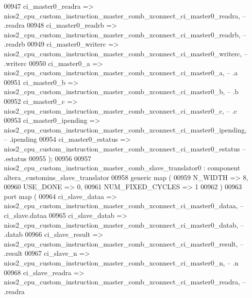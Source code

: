 \begin{DoxyCode}
00947             ci\_master0\_readra   => 
      nios2_cpu_custom_instruction_master_comb_xconnect_ci_master0_readra,\textcolor{keyword}{    --           .readra}
00948             ci\_master0\_readrb   => 
      nios2_cpu_custom_instruction_master_comb_xconnect_ci_master0_readrb,\textcolor{keyword}{    --           .readrb}
00949             ci\_master0\_writerc  => 
      nios2_cpu_custom_instruction_master_comb_xconnect_ci_master0_writerc,\textcolor{keyword}{   --           .writerc}
00950             ci\_master0\_a        => 
      nios2_cpu_custom_instruction_master_comb_xconnect_ci_master0_a,\textcolor{keyword}{         --           .a}
00951             ci\_master0\_b        => 
      nios2_cpu_custom_instruction_master_comb_xconnect_ci_master0_b,\textcolor{keyword}{         --           .b}
00952             ci\_master0\_c        => 
      nios2_cpu_custom_instruction_master_comb_xconnect_ci_master0_c,\textcolor{keyword}{         --           .c}
00953             ci\_master0\_ipending => 
      nios2_cpu_custom_instruction_master_comb_xconnect_ci_master0_ipending,\textcolor{keyword}{  --           .ipending}
00954             ci\_master0\_estatus  => 
      nios2_cpu_custom_instruction_master_comb_xconnect_ci_master0_estatus    \textcolor{keyword}{--           .estatus}
00955         \textcolor{vhdlchar}{)};
00956 
00957     nios2_cpu_custom_instruction_master_comb_slave_translator0 : \textcolor{keywordflow}{component} 
      altera\_customins\_slave\_translator
00958         \textcolor{keywordflow}{generic} \textcolor{keywordflow}{map} (
00959             N\_WIDTH          => \textcolor{vhdllogic}{8},
00960             USE\_DONE         => \textcolor{vhdllogic}{0},
00961             NUM\_FIXED\_CYCLES => \textcolor{vhdllogic}{1}
00962         \textcolor{vhdlchar}{)}
00963         \textcolor{keywordflow}{port} \textcolor{keywordflow}{map} (
00964             ci\_slave\_dataa      => 
      nios2_cpu_custom_instruction_master_comb_xconnect_ci_master0_dataa,\textcolor{keyword}{          --  ci\_slave.dataa}
00965             ci\_slave\_datab      => 
      nios2_cpu_custom_instruction_master_comb_xconnect_ci_master0_datab,\textcolor{keyword}{          --          .datab}
00966             ci\_slave\_result     => 
      nios2_cpu_custom_instruction_master_comb_xconnect_ci_master0_result,\textcolor{keyword}{         --          .result}
00967             ci\_slave\_n          => 
      nios2_cpu_custom_instruction_master_comb_xconnect_ci_master0_n,\textcolor{keyword}{              --          .n}
00968             ci\_slave\_readra     => 
      nios2_cpu_custom_instruction_master_comb_xconnect_ci_master0_readra,\textcolor{keyword}{         --          .readra}

\end{DoxyCode}
